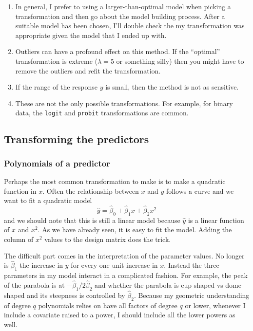 \documentclass[]{book}
\providecommand{\tightlist}{%
  \setlength{\itemsep}{0pt}\setlength{\parskip}{0pt}}
\theoremstyle{definition}
\theoremstyle{definition}
\theoremstyle{remark}
\begin{document}
\begin{enumerate}
\def\labelenumi{\arabic{enumi}.}
\tightlist
\item
  In general, I prefer to using a larger-than-optimal model when picking
  a transformation and then go about the model building process. After a
  suitable model has been chosen, I'll double check the my
  transformation was appropriate given the model that I ended up with.
\item
  Outliers can have a profound effect on this method. If the ``optimal''
  transformation is extreme (\(\lambda=5\) or something silly) then you
  might have to remove the outliers and refit the transformation.
\item
  If the range of the response \(y\) is small, then the method is not as
  sensitive.
\item
  These are not the only possible transformations. For example, for
  binary data, the \texttt{logit} and \texttt{probit} transformations
  are common.
\end{enumerate}

\subsection{Transforming the
predictors}\label{transforming-the-predictors}

\subsubsection{Polynomials of a
predictor}\label{polynomials-of-a-predictor}

Perhaps the most common transformation to make is to make a quadratic
function in \(x\). Often the relationship between \(x\) and \(y\)
follows a curve and we want to fit a quadratic model
\[\hat{y}=\hat{\beta}_{0}+\hat{\beta}_{1}x+\hat{\beta}_{2}x^{2}\] and we
should note that this is still a linear model because \(\hat{y}\) is a
linear function of \(x\) and \(x^{2}\). As we have already seen, it is
easy to fit the model. Adding the column of \(x^{2}\) values to the
design matrix does the trick.

The difficult part comes in the interpretation of the parameter values.
No longer is \(\hat{\beta}_{1}\) the increase in \(y\) for every one
unit increase in \(x\). Instead the three parameters in my model
interact in a complicated fashion. For example, the peak of the parabola
is at \(-\hat{\beta}_{1}/2\hat{\beta}_{2}\) and whether the parabola is
cup shaped vs dome shaped and its steepness is controlled by
\(\hat{\beta}_{2}\). Because my geometric understanding of degree \(q\)
polynomials relies on have all factors of degree \(q\) or lower,
whenever I include a covariate raised to a power, I should include all
the lower powers as well.
\end{document}
